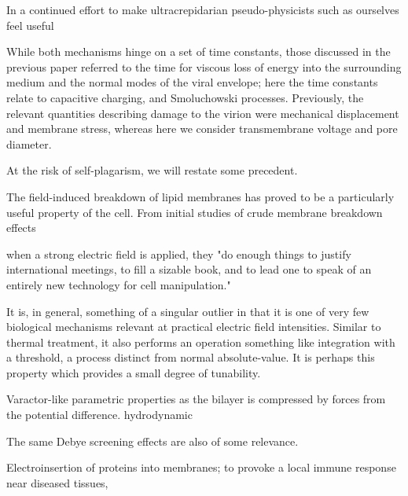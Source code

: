 \documentclass[fleqn,10pt]{paper}
\begin{document}
In a continued effort to make ultracrepidarian pseudo-physicists such as ourselves feel useful 

\begin{tcolorbox}
While both mechanisms hinge on a set of time constants, those discussed in the previous paper referred to the time for viscous loss of energy into the surrounding medium and the normal modes of the viral envelope; here the time constants relate to capacitive charging, and Smoluchowski processes. Previously, the relevant quantities describing damage to the virion were mechanical displacement and membrane stress, whereas here we consider transmembrane voltage and pore diameter. 
\end{tcolorbox}

At the risk of self-plagarism, we will restate some precedent.

The field-induced breakdown of lipid membranes has proved to be a particularly useful property of the cell. From initial studies of crude membrane breakdown effects \cite{Reversible1979}

when a strong electric field is applied, they "do enough things to justify international meetings, to fill a sizable book, and to lead one to speak of an entirely new technology for cell manipulation."

It is, in general, something of a singular outlier in that it is one of very few biological mechanisms relevant at practical electric field intensities. Similar to thermal treatment, it also performs an operation something like integration with a threshold, a process distinct from normal absolute-value. It is perhaps this property which provides a small degree of tunability.



Varactor-like parametric properties as the bilayer is compressed by forces from the potential difference. hydrodynamic

The same Debye screening effects are also of some relevance. 

Electroinsertion of proteins into membranes\cite{Clinical1996}; to provoke a local immune response near diseased tissues, 
\end{document}
